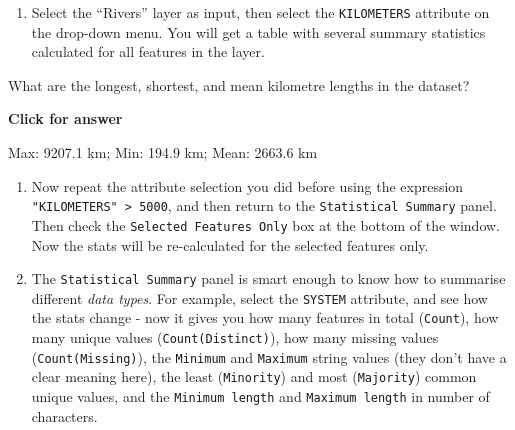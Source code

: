 \documentclass[
  letterpaper,
  DIV=11,
  numbers=noendperiod]{scrreprt}
\providecommand{\tightlist}{%
  \setlength{\itemsep}{0pt}\setlength{\parskip}{0pt}}\usepackage{longtable,booktabs,array}
\begin{document}
\begin{enumerate}
\def\labelenumi{(\arabic{enumi})}
\setcounter{enumi}{92}
\tightlist
\item
  Select the ``Rivers'' layer as input, then select the
  \texttt{KILOMETERS} attribute on the drop-down menu. You will get a
  table with several summary statistics calculated for all features in
  the layer.
\end{enumerate}

\begin{tcolorbox}[enhanced jigsaw, coltitle=black, toprule=.15mm, breakable, opacitybacktitle=0.6, left=2mm, colback=white, leftrule=.75mm, rightrule=.15mm, colbacktitle=quarto-callout-important-color!10!white, toptitle=1mm, titlerule=0mm, colframe=quarto-callout-important-color-frame, arc=.35mm, bottomtitle=1mm, opacityback=0, bottomrule=.15mm, title=\textcolor{quarto-callout-important-color}{\faExclamation}\hspace{0.5em}{Stop and Think}]

What are the longest, shortest, and mean kilometre lengths in the
dataset?

\end{tcolorbox}

\begin{tcolorbox}[enhanced jigsaw, toprule=.15mm, breakable, left=2mm, colframe=quarto-callout-important-color-frame, colback=white, arc=.35mm, leftrule=.75mm, opacityback=0, rightrule=.15mm, bottomrule=.15mm]

\vspace{-3mm}\textbf{Click for answer}\vspace{3mm}

Max: 9207.1 km; Min: 194.9 km; Mean: 2663.6 km

\end{tcolorbox}

\begin{enumerate}
\def\labelenumi{(\arabic{enumi})}
\setcounter{enumi}{93}
\item
  Now repeat the attribute selection you did before using the expression
  \texttt{"KILOMETERS"\ \textgreater{}\ 5000}, and then return to the
  \texttt{Statistical\ Summary} panel. Then check the
  \texttt{Selected\ Features\ Only} box at the bottom of the window. Now
  the stats will be re-calculated for the selected features only.
\item
  The \texttt{Statistical\ Summary} panel is smart enough to know how to
  summarise different \emph{data types}. For example, select the
  \texttt{SYSTEM} attribute, and see how the stats change - now it gives
  you how many features in total (\texttt{Count}), how many unique
  values (\texttt{Count(Distinct)}), how many missing values
  (\texttt{Count(Missing)}), the \texttt{Minimum} and \texttt{Maximum}
  string values (they don't have a clear meaning here), the least
  (\texttt{Minority}) and most (\texttt{Majority}) common unique values,
  and the \texttt{Minimum\ length} and \texttt{Maximum\ length} in
  number of characters.
\end{enumerate}
\end{document}
